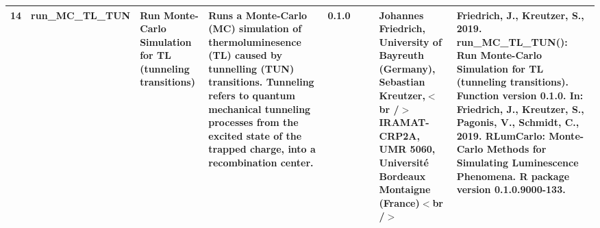 \begin{table}[ht]
\begin{tabular}{rllllllll}
 \\ 
  14 & run\_MC\_TL\_TUN & Run Monte-Carlo Simulation for TL (tunneling transitions) & Runs a Monte-Carlo (MC) simulation of thermoluminesence (TL) caused by tunnelling (TUN) transitions.  Tunneling refers to quantum mechanical tunneling processes from the excited state of the trapped charge, into a recombination center. & 0.1.0
 &  &  & Johannes Friedrich, University of Bayreuth (Germany), Sebastian Kreutzer,$<$br /$>$ IRAMAT-CRP2A, UMR 5060, Université Bordeaux Montaigne (France)$<$br /$>$ & Friedrich, J., Kreutzer, S., 2019. run\_MC\_TL\_TUN(): Run Monte-Carlo Simulation for TL (tunneling transitions). Function version 0.1.0. In: Friedrich, J., Kreutzer, S., Pagonis, V., Schmidt, C., 2019. RLumCarlo: Monte-Carlo Methods for Simulating Luminescence Phenomena. R package version 0.1.0.9000-133. 
 \\ 
   \hline
\end{tabular}
\end{table}

